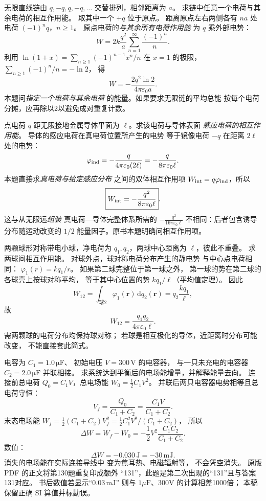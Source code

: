 无限直线链由 $q,-q,q,-q,\ldots$
交替排列，相邻距离为 $a$。
求链中任意一个电荷与其余电荷的相互作用能。
\exsolution
取其中一个 $+q$ 位于原点。
距离原点左右两侧各有
$n a$ 处电荷 $(-1)^nq$，$n\ge1$。
原点电荷的\emph{与其余所有电荷作用能}
为 $q$ 乘外部电势：
\[
W=2k\frac{q^2}{a}
\sum_{n=1}^\infty\frac{(-1)^n}{n}.
\]
利用
$\ln(1+x)=\sum_{n\ge1}(-1)^{n-1}x^n/n$
在 $x=1$ 的极限，
$\sum_{n\ge1}(-1)^n/n=-\ln2$，
得
\[
\boxed{W=-\frac{2q^2\ln2}
{4\pi\varepsilon_0a}}.
\]
\excheck 本题问\emph{指定一个电荷与其余电荷}
的能量。如果要求无限链的平均总能
按每个电荷分摊，应再除以2以避免成对重复计数。

点电荷 $q$ 距无限接地金属导体平面为
$\ell$。求该电荷与导体表面
\emph{感应电荷的相互作用能}。
\exsolution
导体的感应电荷在真电荷位置所产生的电势
等于镜像电荷 $-q$ 在距离 $2\ell$ 处的电势：
\[
\varphi_{\rm ind}=
-\frac{q}{4\pi\varepsilon_0(2\ell)}
=-\frac{q}{8\pi\varepsilon_0\ell}.
\]
本题直接求\emph{真电荷与给定感应分布}
之间的双体相互作用项
$W_{\rm int}=q\varphi_{\rm ind}$，所以
\[
\boxed{W_{\rm int}=
-\frac{q^2}{8\pi\varepsilon_0\ell}}.
\]
\excheck 这与从无限远\emph{组装}
真电荷—导体完整体系所需的
$-\frac{q^2}{16\pi\varepsilon_0\ell}$
不相同：后者包含诱导分布随运动改变的
$1/2$ 能量因子。原书本题明确问相互作用项。

两颗球形对称带电小球，净电荷为
$q_1,q_2$，两球中心距离为
$\ell$，彼此不重叠。
求两球间相互作用能。
\exsolution
对球外点，球对称电荷分布产生的静电势
与中心点电荷相同：
$\varphi_1(r)=kq_1/r$。
如果第二球完整位于第一球之外，
第一球的势在第二球的各球壳上按球对称平均，
等于其中心位置的势
$kq_1/\ell$（平均值定理）。
因此
\[
W_{12}=\int_{\text{球2}}\varphi_1(\bm r)
\,\mathrm dq_2(\bm r)
=q_2\frac{kq_1}{\ell},
\]
故
\[
\boxed{W_{12}=
\frac{q_1q_2}{4\pi\varepsilon_0\ell}}.
\]
\excheck 需两颗球的电荷分布均保持球对称；
若球是相互极化的导体，近距离时分布可能改变，
不能直接套此简式。

电容为 $C_1=1.0\,\mathrm{\mu F}$、
初始电压 $V=300\,\mathrm V$ 的电容器，
与一只未充电的电容器
$C_2=2.0\,\mathrm{\mu F}$ 并联相接。
求系统达到平衡后的电场能增量，并解释能量去向。
\exsolution
连接前总电荷
$Q_0=C_1V$，总电场能
$W_0=\frac12C_1V^2$。
并联后两只电容器电势相等且总电荷守恒：
\[
V_f=\frac{Q_0}{C_1+C_2}=\frac{C_1V}{C_1+C_2}.
\]
末态电场能
$W_f=\frac12(C_1+C_2)V_f^2
=\frac12 C_1^2V^2/(C_1+C_2)$，
所以
\[
\boxed{\Delta W=W_f-W_0
=-\frac12V^2\frac{C_1C_2}{C_1+C_2}}.
\]
数值：
\[
\boxed{\Delta W=-0.030\,\mathrm J=-30\,\mathrm{mJ}}.
\]
消失的电场能在实际连接导线中
变为焦耳热、电磁辐射等，
不会凭空消失。
\excheck 原版 PDF 的正文将第130题重复印成额外
“131”，此题是第二次出现的“131”且与答案131对应。
书后数值若显示“$0.03\,\mathrm{mJ}$”
则与 $1\mu\mathrm F$、300V 的计算相差1000倍；
本稿保留正确 SI 算值并标勘误。

